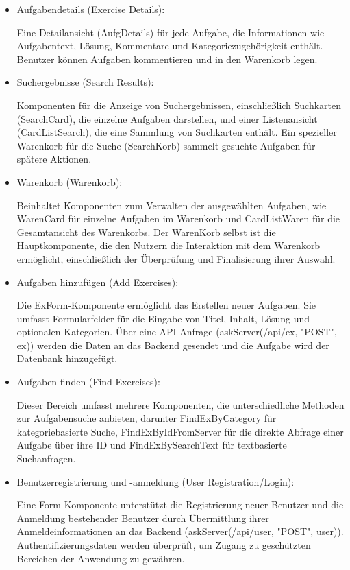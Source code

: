 \documentclass[12pt,a4paper]{scrartcl} %
\begin{document}
\begin{itemize}


\item Aufgabendetails (Exercise Details):

Eine Detailansicht (AufgDetails) für jede Aufgabe, die Informationen wie Aufgabentext, Lösung, Kommentare und Kategoriezugehörigkeit enthält. Benutzer können Aufgaben kommentieren und in den Warenkorb legen.

\item Suchergebnisse (Search Results):

Komponenten für die Anzeige von Suchergebnissen, einschließlich Suchkarten (SearchCard), die einzelne Aufgaben darstellen, und einer Listenansicht (CardListSearch), die eine Sammlung von Suchkarten enthält. Ein spezieller Warenkorb für die Suche (SearchKorb) sammelt gesuchte Aufgaben für spätere Aktionen.

\item Warenkorb (Warenkorb):

Beinhaltet Komponenten zum Verwalten der ausgewählten Aufgaben, wie WarenCard für einzelne Aufgaben im Warenkorb und CardListWaren für die Gesamtansicht des Warenkorbs. Der WarenKorb selbst ist die Hauptkomponente, die den Nutzern die Interaktion mit dem Warenkorb ermöglicht, einschließlich der Überprüfung und Finalisierung ihrer Auswahl.

\item Aufgaben hinzufügen (Add Exercises):

Die ExForm-Komponente ermöglicht das Erstellen neuer Aufgaben. Sie umfasst Formularfelder für die Eingabe von Titel, Inhalt, Lösung und optionalen Kategorien. Über eine API-Anfrage (askServer(/api/ex, "POST", ex)) werden die Daten an das Backend gesendet und die Aufgabe wird der Datenbank hinzugefügt.

\item Aufgaben finden (Find Exercises):

Dieser Bereich umfasst mehrere Komponenten, die unterschiedliche Methoden zur Aufgabensuche anbieten, darunter FindExByCategory für kategoriebasierte Suche, FindExByIdFromServer für die direkte Abfrage einer Aufgabe über ihre ID und FindExBySearchText für textbasierte Suchanfragen.

\item Benutzerregistrierung und -anmeldung (User Registration/Login):

Eine Form-Komponente unterstützt die Registrierung neuer Benutzer und die Anmeldung bestehender Benutzer durch Übermittlung ihrer Anmeldeinformationen an das Backend (askServer(/api/user, "POST", user)). Authentifizierungsdaten werden überprüft, um Zugang zu geschützten Bereichen der Anwendung zu gewähren.


\end{itemize}
\end{document}
